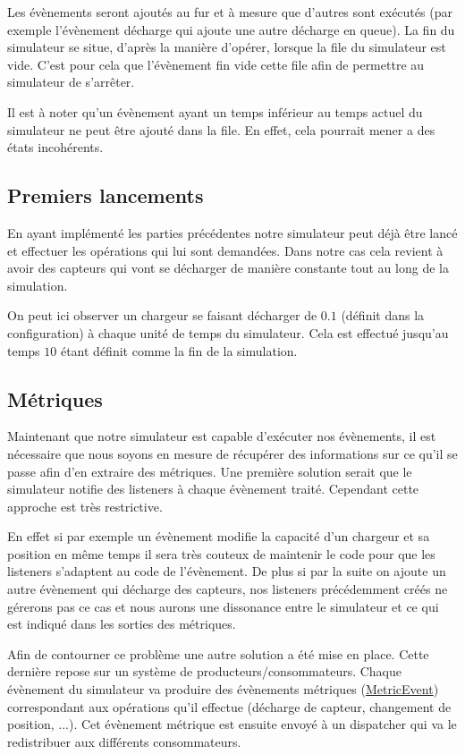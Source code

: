 \documentclass[final]{polytech/polytech}
\newcommand{\klass}[1]{\hyperref[class:#1]{#1}}
\begin{document}
					Les évènements seront ajoutés au fur et à mesure que d'autres sont exécutés (par exemple l'évènement décharge qui ajoute une autre décharge en queue).
					La fin du simulateur se situe, d'après la manière d'opérer, lorsque la file du simulateur est vide.
					C'est pour cela que l'évènement fin vide cette file afin de permettre au simulateur de s'arrêter.
					
					Il est à noter qu'un évènement ayant un temps inférieur au temps actuel du simulateur ne peut être ajouté dans la file.
					En effet, cela pourrait mener a des états incohérents.
					
				\subsection{Premiers lancements}
					En ayant implémenté les parties précédentes notre simulateur peut déjà être lancé et effectuer les opérations qui lui sont demandées.
					Dans notre cas cela revient à avoir des capteurs qui vont se décharger de manière constante tout au long de la simulation.
					
					
					On peut ici observer un chargeur se faisant décharger de $0.1$ (définit dans la configuration) à chaque unité de temps du simulateur.
					Cela est effectué jusqu'au temps $10$ étant définit comme la fin de la simulation.
					
			\subsection{Métriques}
				Maintenant que notre simulateur est capable d'exécuter nos évènements, il est nécessaire que nous soyons en mesure de récupérer des informations sur ce qu'il se passe afin d'en extraire des métriques.
				Une première solution serait que le simulateur notifie des listeners à chaque évènement traité.
				Cependant cette approche est très restrictive.
				
				En effet si par exemple un évènement modifie la capacité d'un chargeur et sa position en même temps il sera très couteux de maintenir le code pour que les listeners s'adaptent au code de l'évènement.
				De plus si par la suite on ajoute un autre évènement qui décharge des capteurs, nos listeners précédemment créés ne gérerons pas ce cas et nous aurons une dissonance entre le simulateur et ce qui est indiqué dans les sorties des métriques.
				
				Afin de contourner ce problème une autre solution a été mise en place.
				Cette dernière repose sur un système de producteurs/consommateurs.
				Chaque évènement du simulateur va produire des évènements métriques (\klass{MetricEvent}) correspondant aux opérations qu'il effectue (décharge de capteur, changement de position, ...).
				Cet évènement métrique est ensuite envoyé à un dispatcher qui va le redistribuer aux différents consommateurs.
				
\end{document}
